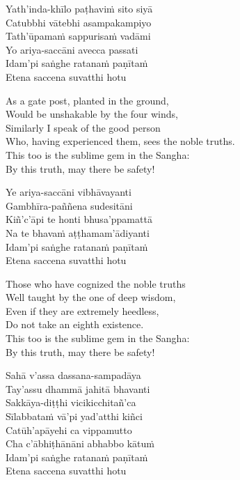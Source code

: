 \begin{pali-hang-continued}
  Yath'inda-khīlo paṭhaviṁ sito siyā\\
  Catubbhi vātebhi asampakampiyo\\
  Tath'ūpamaṁ sappurisaṁ vadāmi\\
  Yo ariya-saccāni avecca passati\\
  Idam'pi saṅghe ratanaṁ paṇītaṁ\\
  Etena saccena suvatthi hotu
\end{pali-hang-continued}

\begin{english-verses}
  As a gate post, planted in the ground,\\
  Would be unshakable by the four winds,\\
  Similarly I speak of the good person\\
  Who, having experienced them, sees the noble truths.\\
  This too is the sublime gem in the Sangha:\\
  By this truth, may there be safety!
\end{english-verses}

\begin{pali-hang-continued}
  Ye ariya-saccāni vibhāvayanti\\
  Gambhīra-paññena sudesitāni\\
  Kiñ'c'āpi te honti bhusa'ppamattā\\
  Na te bhavaṁ aṭṭhamam'ādiyanti\\
  Idam'pi saṅghe ratanaṁ paṇītaṁ\\
  Etena saccena suvatthi hotu
\end{pali-hang-continued}

\begin{english-verses}
  Those who have cognized the noble truths\\
  Well taught by the one of deep wisdom,\\
  Even if they are extremely heedless,\\
  Do not take an eighth existence.\\
  This too is the sublime gem in the Sangha:\\
  By this truth, may there be safety!
\end{english-verses}

\begin{pali-hang-continued}
  Sahā v'assa dassana-sampadāya\\
  Tay'assu dhammā jahitā bhavanti\\
  Sakkāya-diṭṭhi vicikicchitañ'ca\\
  Sīlabbataṁ vā'pi yad'atthi kiñci\\
  Catūh'apāyehi ca vippamutto\\
  Cha c'ābhiṭhānāni abhabbo kātuṁ\\
  Idam'pi saṅghe ratanaṁ paṇītaṁ\\
  Etena saccena suvatthi hotu
\end{pali-hang-continued}

